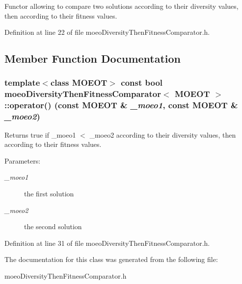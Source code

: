Functor allowing to compare two solutions according to their diversity values, then according to their fitness values. 



Definition at line 22 of file moeo\-Diversity\-Then\-Fitness\-Comparator.h.

\subsection{Member Function Documentation}
\subsubsection{\setlength{\rightskip}{0pt plus 5cm}template$<$class MOEOT$>$ const bool \bf{moeo\-Diversity\-Then\-Fitness\-Comparator}$<$ MOEOT $>$::operator() (const MOEOT \& {\em \_\-moeo1}, const MOEOT \& {\em \_\-moeo2})\hspace{0.3cm}{\tt  [inline]}}\label{classmoeoDiversityThenFitnessComparator_62620887203d033af92091d838d4b0b6}


Returns true if \_\-moeo1 $<$ \_\-moeo2 according to their diversity values, then according to their fitness values. 

\begin{Desc}
\item[Parameters:]
\begin{description}
\item[{\em \_\-moeo1}]the first solution \item[{\em \_\-moeo2}]the second solution \end{description}
\end{Desc}


Definition at line 31 of file moeo\-Diversity\-Then\-Fitness\-Comparator.h.

The documentation for this class was generated from the following file:\begin{CompactItemize}
\item 
moeo\-Diversity\-Then\-Fitness\-Comparator.h\end{CompactItemize}
